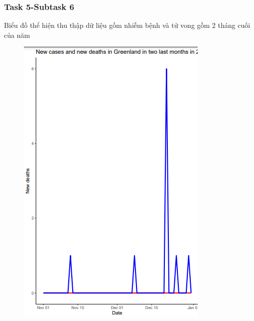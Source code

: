 \documentclass[english,10pt,table]{beamer}
\begin{document}
{
    \frametitle{Task 5-Subtask 6}
    \begin{block}{Biểu đồ thể hiện thu thập dữ liệu gồm nhiễm bệnh và tử vong gồm 2 tháng cuối của năm}
    \begin{figure}[H]
		\centering
		\includegraphics[scale=0.5]{images/5.6.2.png}
	\end{figure}
    \end{block}
}
\frame
\end{document}
